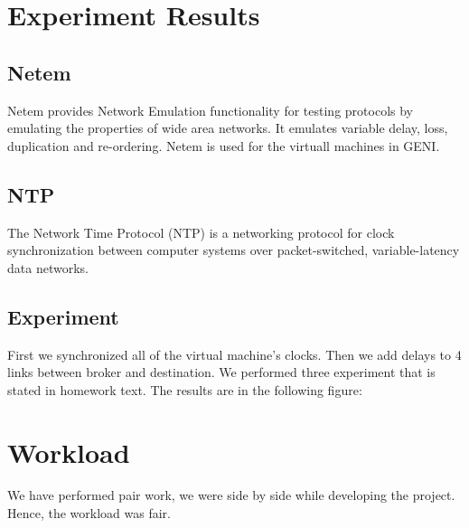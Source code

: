 \documentclass[conference]{IEEEtran}
\begin{document}
\section{Experiment Results}

\subsection{Netem}
Netem provides Network Emulation functionality for testing protocols by emulating the properties of wide area networks. It emulates variable delay, loss, duplication and re-ordering. Netem is used for the virtuall machines in GENI.

\subsection{NTP}
The Network Time Protocol (NTP) is a networking protocol for clock synchronization between computer systems over packet-switched, variable-latency data networks.

\subsection{Experiment}

First we synchronized all of the virtual machine's clocks. Then we add delays to 4 links between broker and destination. We performed three experiment that is stated in homework text. The results are in the following figure:


\section{Workload}

We have performed pair work, we were side by side while developing the project. Hence, the workload was fair.
\end{document}
